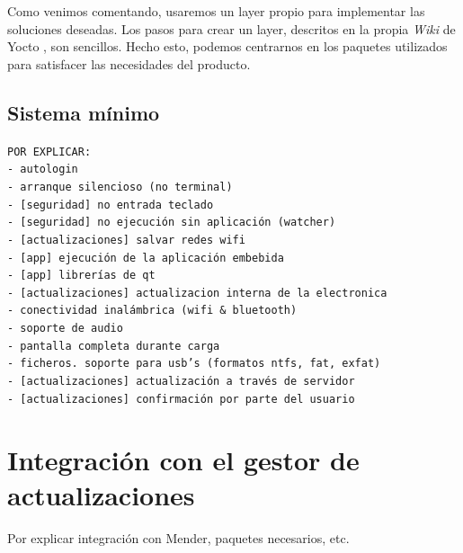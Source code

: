 Como venimos comentando, usaremos un layer propio para implementar las soluciones deseadas. Los pasos para crear un layer, descritos en la propia \textit{Wiki} de Yocto \cite{wiki-yocto-own-layer}, son sencillos. Hecho esto, podemos centrarnos en los paquetes utilizados para satisfacer las necesidades del producto.

\subsection{Sistema mínimo}


\texttt{POR EXPLICAR:\\
	- autologin\\
	- arranque silencioso (no terminal)\\
	- [seguridad] no entrada teclado\\
	- [seguridad] no ejecución sin aplicación (watcher)\\
	- [actualizaciones] salvar redes wifi\\
	- [app] ejecución de la aplicación embebida\\
	- [app] librerías de qt\\
	- [actualizaciones] actualizacion interna de la electronica\\
	- conectividad inalámbrica (wifi \& bluetooth)\\
	- soporte de audio\\
	- pantalla completa durante carga\\
	- ficheros. soporte para usb's (formatos ntfs, fat, exfat)\\
	- [actualizaciones] actualización a través de servidor\\
	- [actualizaciones] confirmación por parte del usuario}\\

\section{Integración con el gestor de actualizaciones}

Por explicar integración con Mender, paquetes necesarios, etc.

\newpage